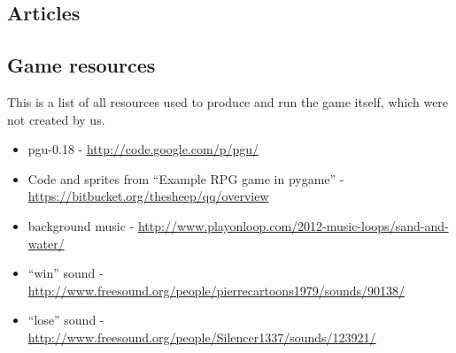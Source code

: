 \subsection{Articles}
\subsection{Game resources}
This is a list of all resources used to produce and run the game
itself, which were not created by us.

\begin{itemize}
\item pgu-0.18 - \url{http://code.google.com/p/pgu/}
\item Code and sprites from ``Example RPG game in pygame'' - \url{https://bitbucket.org/thesheep/qq/overview}
\item background music - \url{http://www.playonloop.com/2012-music-loops/sand-and-water/}
\item ``win'' sound - \url{http://www.freesound.org/people/pierrecartoons1979/sounds/90138/}
\item ``lose'' sound - \url{http://www.freesound.org/people/Silencer1337/sounds/123921/}
\end{itemize}



